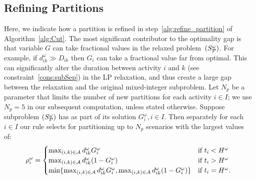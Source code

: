 \documentclass[11pt]{article}
\newcommand{\cA}{{\cal A}}
\newcommand{\cP}{{\cal P}}
\begin{document}
	\subsection{Refining Partitions}\label{subsec:refine} 
	Here, we indicate how a partition is refined in step~\ref{alg:refine_partition} of Algorithm~\ref{alg:Cut}. 
	The most significant contributor to the optimality gap is that variable \(G\) can take fractional values in the relaxed problem~\((S_{\cP}^\omega)\). For example, if \(d_{ik}^\omega \gg D_{ik}\) then \(G_i\) can take a fractional value far from optimal.
	This can significantly alter the duration between activity \(i\) and \(k\) (see constraint~\eqref{cons:subSep}) in the LP relaxation, and thus create a large gap between the relaxation and the original mixed-integer subproblem. Let \(N_p\) be a parameter that limits the number of new partitions for each activity \(i \in I\); we use $N_p=5$ in our subsequent computation, unless stated otherwise. Suppose subproblem \((S_\cP^\omega)\) has as part of its solution \({G}_i^\omega, i \in I \). 
	Then separately for each $i \in I$ our rule selects for partitioning up to \(N_p\) scenarios with the largest values of:
	\begin{align}\label{eqn:define_rho}
	    \rho_{i}^{{\omega}} = \begin{cases}
    	\max_{(i,k) \in \cA} d_{ik}^{{\omega}} {G}_i^\omega & \text{if } t_i < H^{{\omega}}\\
    	\max_{(i,k) \in \cA} d_{ik}^{{\omega}} (1 - {G}_i^\omega) & \text{if } t_i > H^{{\omega}}\\
    	\min\{\max_{(i,k) \in \cA} d_{ik}^{{\omega}} {G}_i^\omega, \max_{(i,k) \in \cA} d_{ik}^{{\omega}} (1 - {G}_i^\omega)\} & \text{if $t_i=H^{\omega}$.}
    	\end{cases}
	\end{align}
	
\end{document}
